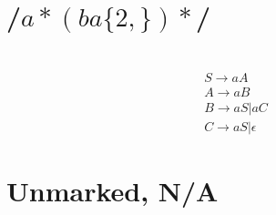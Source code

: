 \documentclass{article} %
\begin{document}
    \section{/$a*(ba\{2,\})*$/}
    \section{}
            \begin{gather*}
                S \to aA\\
                A \to aB\\
                B \to aS | aC\\
                C \to aS | \epsilon
            \end{gather*}
    \section{Unmarked, N/A}
\end{document}
